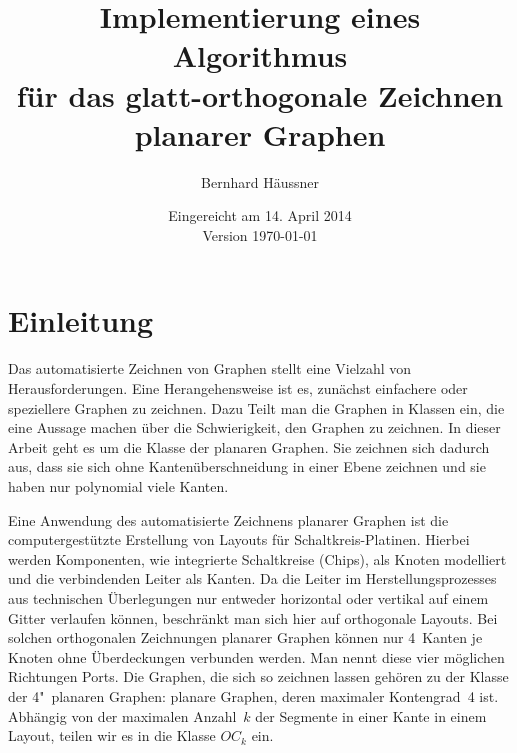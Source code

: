 \documentclass[a4paper]{scrreprt}
\theoremstyle{definition}
\begin{document}


\subject{Bachelorarbeit}
\title{Implementierung eines Algorithmus\\ für das glatt-orthogonale Zeichnen \\ planarer Graphen} %
\author{Bernhard Häussner} %
\date{Eingereicht am 14. April 2014 \\ Version \today} %
\titlehead{Julius-Maximilians-Universität Würzburg\\
Institut für Informatik\\
Lehrstuhl für Informatik I\\
Effiziente Algorithmen und wissensbasierte Systeme}
\publishers{Betreuer:\\
Prof.\ Dr.\ Alexander Wolff\\
Dipl.-Inf.\ Philipp Kindermann} %
\maketitle
\tableofcontents








\chapter{Einleitung}
\label{chap:intro}

Das automatisierte Zeichnen von Graphen stellt eine Vielzahl von Herausforderungen. 
Eine Herangehensweise ist es, zunächst einfachere oder speziellere Graphen zu zeichnen. 
Dazu Teilt man die Graphen in Klassen ein, die eine Aussage machen über die Schwierigkeit, den Graphen zu zeichnen. 
In dieser Arbeit geht es um die Klasse der planaren Graphen. Sie zeichnen sich dadurch aus, dass sie sich ohne Kantenüberschneidung in einer Ebene zeichnen und sie haben nur polynomial viele Kanten. 

Eine Anwendung des  automatisierte Zeichnens planarer Graphen ist die computergestützte Erstellung von Layouts für Schaltkreis-Platinen. Hierbei werden Komponenten, wie integrierte Schaltkreise (Chips), als Knoten modelliert und die verbindenden Leiter als Kanten. Da die Leiter im Herstellungsprozesses  aus technischen Überlegungen nur entweder horizontal oder vertikal auf einem Gitter verlaufen können, beschränkt man sich hier auf orthogonale Layouts. Bei solchen orthogonalen Zeichnungen planarer Graphen können nur 4~Kanten je Knoten ohne Überdeckungen verbunden werden. Man nennt diese vier möglichen Richtungen Ports. Die Graphen, die sich so zeichnen lassen gehören zu der Klasse der 4"~planaren Graphen: planare Graphen, deren maximaler Kontengrad~4 ist. Abhängig von der maximalen Anzahl~$k$ der Segmente in einer Kante in einem Layout, teilen wir es in die Klasse $OC_k$ ein.
\end{document}

